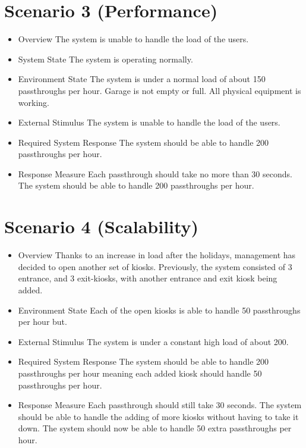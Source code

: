 \pagebreak
\section{Scenario 3 (Performance)}
\begin{itemize}
	\item  Overview
	      \subitem The system is unable to handle the load of the users.
	\item  System State
	      \subitem The system is operating normally.
	\item  Environment State
	      \subitem The system is under a normal load of about 150 passthroughs per hour.
	      \subitem Garage is not empty or full. All physical equipment is working.
	\item  External Stimulus
	      \subitem The system is unable to handle the load of the users.
	\item  Required System Response
	      \subitem The system should be able to handle 200 passthroughs per hour.
	\item  Response Measure
	      \subitem Each passthrough should take no more than 30 seconds.
	      \subitem The system should be able to handle 200 passthroughs per hour.
\end{itemize}
\pagebreak

\section{Scenario 4 (Scalability)}
\begin{itemize}
	\item  Overview
	      \subitem Thanks to an increase in load after the holidays, management has decided to open another set of kiosks.
	      \subitem Previously, the system consisted of 3 entrance, and 3 exit-kiosks, with another entrance and exit kiosk being added.
	\item  Environment State
	      \subitem Each of the open kiosks is able to handle 50 passthroughs per hour but.
	\item  External Stimulus
	      \subitem The system is under a constant high load of about 200.
	\item  Required System Response
	      \subitem The system should be able to handle 200 passthroughs per hour meaning each added kiosk should handle 50 passthroughs per hour.
	\item  Response Measure
	      \subitem Each passthrough should still take 30 seconds.
	      \subitem The system should be able to handle the adding of more kiosks without having to take it down.
	      \subitem The system should now be able to handle 50 extra passthroughs per hour.
\end{itemize}
\pagebreak

